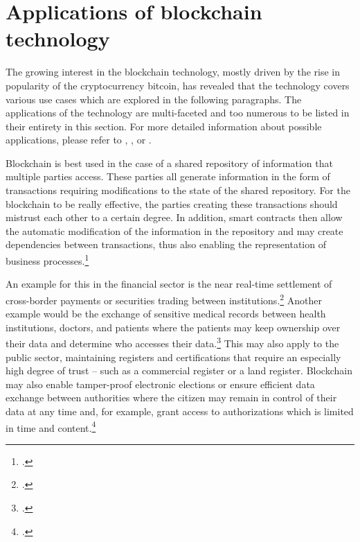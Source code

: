 \section{Applications of blockchain technology} \label{sec:SmartContracts}
The growing interest in the blockchain technology, mostly driven by the rise in popularity of the cryptocurrency bitcoin, has revealed that the technology covers various use cases which are explored in the following paragraphs. The applications of the technology are multi-faceted and too numerous to be listed in their entirety in this section. For more detailed information about possible applications, please refer to \cite{AntonopolousAndreasM..2017}, \cite{SchatskybitcoinBlockchaincoming2015}, or \cite{Schutte.2017}.

Blockchain is best used in the case of a shared repository of information that multiple parties access. These parties all generate information in the form of transactions requiring modifications to the state of the shared repository. For the blockchain to be really effective, the parties creating these transactions should mistrust each other to a certain degree. In addition, smart contracts then allow the automatic modification of the information in the repository and may create dependencies between transactions, thus also enabling the representation of business processes.\footcites[Cf.][p.8]{MulliganBlockchainHypePractical2018}[cf.][p.5]{Tapscott.2017}[cf.][p.166]{DannenIntroducingethereumsolidity2017}

An example for this in the financial sector is the near real-time settlement of cross-border payments or securities trading between institutions.\footcite[Cf.][]{SchatskybitcoinBlockchaincoming2015} Another example would be the exchange of sensitive medical records between health institutions, doctors, and patients where the patients may keep ownership over their data and determine who accesses their data.\footcites[Cf.][p.170]{DannenIntroducingethereumsolidity2017}[cf.][p.18]{Schutte.2017} This may also apply to the public sector, maintaining registers and certifications that require an especially high degree of trust – such as a commercial register or a land register. Blockchain may also enable tamper-proof electronic elections or ensure efficient data exchange between authorities where the citizen may remain in control of their data at any time and, for example, grant access to authorizations which is limited in time and content.\footcites[Cf.][p.18]{Schutte.2017}  


